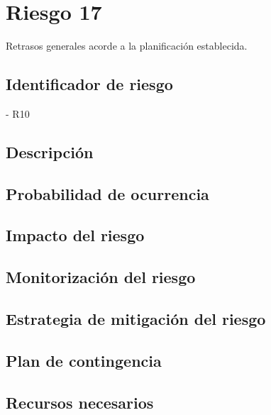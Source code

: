 \section{Riesgo 17}

Retrasos generales acorde a la planificación establecida.

\subsection{Identificador de riesgo}
- R10
\subsection{Descripción}
\subsection{Probabilidad de ocurrencia}
\subsection{Impacto del riesgo}
\subsection{Monitorización del riesgo}
\subsection{Estrategia de mitigación del riesgo}
\subsection{Plan de contingencia}
\subsection{Recursos necesarios}


%
%

       
